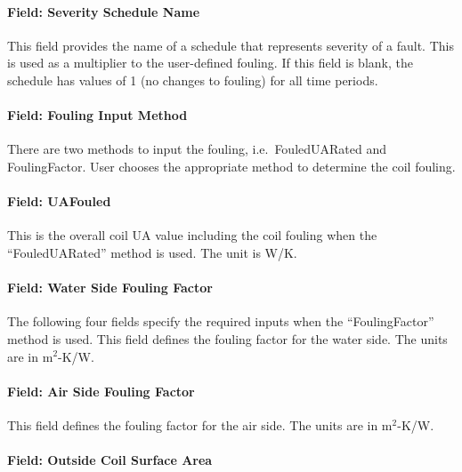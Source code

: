 \paragraph{Field: Severity Schedule Name}\label{field-severity-schedule-name-5}

This field provides the name of a schedule that represents severity of a fault. This is used as a multiplier to the user-defined fouling. If this field is blank, the schedule has values of 1 (no changes to fouling) for all time periods.

\paragraph{Field: Fouling Input Method}\label{field-fouling-input-method}

There are two methods to input the fouling, i.e.~FouledUARated and FoulingFactor. User chooses the appropriate method to determine the coil fouling.

\paragraph{Field: UAFouled}\label{field-uafouled}

This is the overall coil UA value including the coil fouling when the ``FouledUARated'' method is used. The unit is W/K.

\paragraph{Field: Water Side Fouling Factor}\label{field-water-side-fouling-factor}

The following four fields specify the required inputs when the ``FoulingFactor'' method is used. This field defines the fouling factor for the water side. The units are in m\(^{2}\)-K/W.

\paragraph{Field: Air Side Fouling Factor}\label{field-air-side-fouling-factor}

This field defines the fouling factor for the air side. The units are in m\(^{2}\)-K/W.

\paragraph{Field: Outside Coil Surface Area}\label{field-outside-coil-surface-area}

